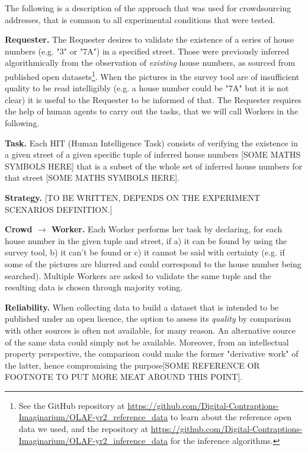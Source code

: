         The following is a description of the approach that was used for crowdsourcing addresses, that is common to all experimental conditions that were tested.
        
        \textbf{Requester.} The Requester desires to validate the existence of a series of house numbers (e.g. "3" or "7A") in a specified street. Those were previously inferred algorithmically from the observation of \textit{existing} house numbers, as sourced from published open datasets\footnote{See the GitHub repository at \url{https://github.com/Digital-Contraptions-Imaginarium/OLAF-yr2_reference_data} to learn about the reference open data we used, and the repository at \url{https://github.com/Digital-Contraptions-Imaginarium/OLAF-yr2_inference_data} for the inference algorithms.}. When the pictures in the survey tool are of insufficient quality to be read intelligibly (e.g. a house number could be "7A" but it is not clear) it is useful to the Requester to be informed of that. The Requester requires the help of human agents to carry out the tasks, that we will call Workers in the following.
        
        \textbf{Task.} Each HIT (Human Intelligence Task) consists of verifying the existence in a given street of a given specific tuple of inferred house numbers {[}SOME MATHS SYMBOLS HERE{]} that is a subset of the whole set of inferred house numbers for that street {[}SOME MATHS SYMBOLS HERE{]}. 
        
        \textbf{Strategy.} 
        {[}TO BE WRITTEN, DEPENDS ON THE EXPERIMENT SCENARIOS DEFINITION.{]}
        
        \textbf{Crowd $\rightarrow$ Worker.} Each Worker performs her task by declaring, for each house number in the given tuple and street, if a) it can be found by using the survey tool, b) it can't be found or c) it cannot be said with certainty (e.g. if some of the pictures are blurred and could correspond to the house number being searched). Multiple Workers are asked to validate the same tuple and the resulting data is chosen through majority voting.
        
        \textbf{Reliability.} When collecting data to build a dataset that is intended to be published under an open licence, the option to assess its \textit{quality} by comparison with other sources is often not available, for many reason. An alternative source of the same data could simply not be available. Moreover, from an intellectual property perspective, the comparison could make the former "derivative work" of the latter, hence compromising the purpose{[}SOME REFERENCE OR FOOTNOTE TO PUT MORE MEAT AROUND THIS POINT{]}. 
        

